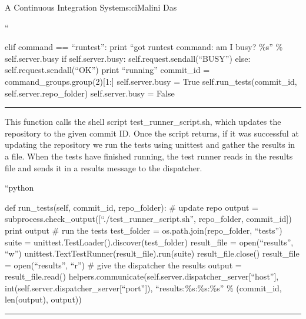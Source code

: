 \begin{aosachapter}{A Continuous Integration System}{s:ci}{Malini Das}
\begin{aosadescription}
\item[``]
\begin{aosadescription}

\item[elif command == ``runtest'':]
print ``got runtest command: am I busy? \%s'' \% self.server.busy if
self.server.busy: self.request.sendall(``BUSY'') else:
self.request.sendall(``OK'') print ``running'' commit\_id =
command\_groups.group(2){[}1:{]} self.server.busy = True
self.run\_tests(commit\_id, self.server.repo\_folder) self.server.busy =
False
\end{aosadescription}
\end{aosadescription}

\begin{center}\rule{3in}{0.4pt}\end{center}

This function calls the shell script test\_runner\_script.sh, which
updates the repository to the given commit ID. Once the script returns,
if it was successful at updating the repository we run the tests using
unittest and gather the results in a file. When the tests have finished
running, the test runner reads in the results file and sends it in a
results message to the dispatcher.

\begin{aosadescription}
\item[``python]
\begin{aosadescription}

\item[def run\_tests(self, commit\_id, repo\_folder):]
\# update repo output =
subprocess.check\_output({[}``./test\_runner\_script.sh'', repo\_folder,
commit\_id{]}) print output \# run the tests test\_folder =
os.path.join(repo\_folder, ``tests'') suite =
unittest.TestLoader().discover(test\_folder) result\_file =
open(``results'', ``w'')
unittest.TextTestRunner(result\_file).run(suite) result\_file.close()
result\_file = open(``results'', ``r'') \# give the dispatcher the
results output = result\_file.read()
helpers.communicate(self.server.dispatcher\_server{[}``host''{]},
int(self.server.dispatcher\_server{[}``port''{]}),
``results:\%s:\%s:\%s'' \% (commit\_id, len(output), output))
\end{aosadescription}
\end{aosadescription}

\begin{center}\rule{3in}{0.4pt}\end{center}


\end{aosachapter}
